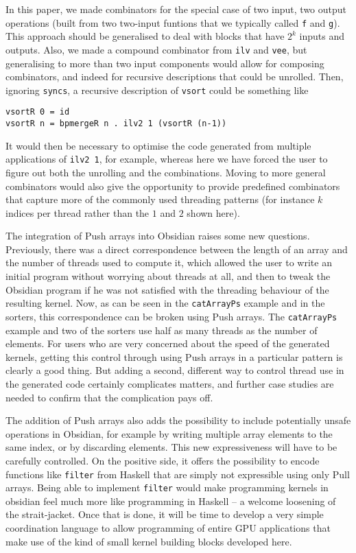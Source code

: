 In this paper, we made combinators for the special case of two input, two
output operations (built from two two-input funtions that we typically called
{\tt f} and {\tt g}). 
This approach should be generalised to deal with blocks that have $2^k$ inputs
and outputs.
Also, we made a compound combinator from {\tt ilv} and {\tt vee},
but generalising to more than two input components would allow
for composing combinators, and indeed for recursive descriptions
that could be unrolled. Then, ignoring {\tt syncs}, a recursive description of
{\tt vsort} could be something like 
\begin{codesize}
\begin{verbatim}
vsortR 0 = id
vsortR n = bpmergeR n . ilv2 1 (vsortR (n-1))
\end{verbatim}
\end{codesize}
\noindent
It would then be necessary to optimise the code generated from
multiple applications of {\tt ilv2 1}, for example, whereas here
we have forced the user to figure out both the unrolling and the combinations.
Moving to more general combinators would also give the opportunity to
provide predefined combinators that capture more of the commonly used threading patterns (for instance $k$ indices per thread rather than the $1$ and $2$ shown here).

The integration of Push arrays into Obsidian raises some new questions.
Previously, there was a direct correspondence between the length 
of an array and the number of threads used to compute it, which
allowed the user to write an initial program without worrying about
threads at all, and then to tweak the Obsidian program if he was not satisfied
with the threading behaviour of the resulting kernel. 
Now, as can be seen in the {\tt catArrayPs} example and in the sorters, this correspondence
can be broken using Push arrays. The {\tt catArrayPs} example and two
of the sorters use half as many threads as the 
number of elements. For users who are very concerned about the speed of
the generated kernels, getting this control through using Push arrays in
a particular pattern is clearly a good thing. But adding a second, different
way to control thread use in the generated code certainly complicates matters, and further case studies are needed to confirm that the complication pays off.

The addition of Push arrays also adds the possibility to include potentially 
unsafe operations in Obsidian, for example by writing multiple array elements to the same index, or by discarding elements.
This new expressiveness will have to be carefully controlled. On the positive side, it offers the possibility to encode functions like {\tt filter} from Haskell
that
are simply not expressible using only Pull arrays. Being able to implement {\tt filter} would make programming kernels in obsidian feel much more like programming in Haskell -- a welcome loosening of the strait-jacket.
Once that is done, it will be time to develop a very simple coordination language to allow programming of entire GPU applications that make use of
the kind of small kernel building blocks developed here.



